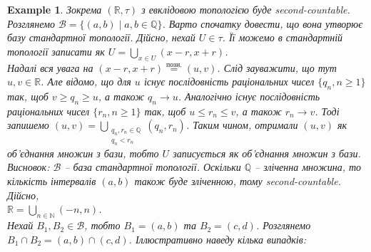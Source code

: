 \documentclass[a4paper, 10pt]{article}
\theoremstyle{theoremdd}
\newtheorem{example}[theorem]{Example}
\begin{document}
\begin{example}
Зокрема $(\mathbb{R},\tau)$ з евклідовою топологією буде second-countable.\\
Розглянемо $\mathcal{B} = \{ (a,b) \mid a,b \in \mathbb{Q} \}$. Варто спочатку довести, що вона утворює базу стандартної топології. Дійсно, нехай $U \in \tau$. Її можемо в стандартній топології записати як $U = \displaystyle\bigcup_{x \in U} (x-r,x+r)$.\\
Надалі вся увага на $(x-r,x+r) \overset{\text{позн.}}{=} (u,v)$. Слід зауважити, що тут $u,v \in \mathbb{R}$. Але відомо, що для $u$ існує послідовність раціональних чисел $\{q_n, n \geq 1\}$ так, щоб $v \geq q_n \geq u$, а також $q_n \to u$. Аналогічно існує послідовність раціональних чисел $\{r_n, n \geq 1\}$ так, щоб $u \leq r_n \leq v$, а також $r_n \to v$. Тоді запишемо $(u,v) = \displaystyle\bigcup_{\substack{q_n,r_n \in \mathbb{Q} \\ q_n < r_n}} (q_n,r_n)$. Таким чином, отримали $(u,v)$ як об'єднання множин з бази, тобто $U$ записується як об'єднання множин з бази.\\
Висновок: $\mathcal{B}$ -- база стандартної топології. Оскільки $\mathbb{Q}$ -- зліченна множина, то кількість інтервалів $(a,b)$ також буде зліченною, тому second-countable.
\iffalse
Дійсно,\\
$\mathbb{R} = \displaystyle\bigcup_{n \in \mathbb{N}} (-n,n)$.\\
Нехай $B_1,B_2 \in \mathcal{B}$, тобто $B_1 = (a,b)$ та $B_2 = (c,d)$. Розглянемо $B_1 \cap B_2 = (a,b) \cap (c,d)$. Іллюстративно наведу кілька випадків:
\begin{figure}[H]
\centering
{}



\end{figure}
\end{example}
\end{document}
